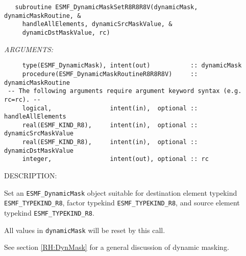 \begin{verbatim}   subroutine ESMF_DynamicMaskSetR8R8R8V(dynamicMask, dynamicMaskRoutine, &
     handleAllElements, dynamicSrcMaskValue, &
     dynamicDstMaskValue, rc)\end{verbatim}{\em ARGUMENTS:}
\begin{verbatim}     type(ESMF_DynamicMask), intent(out)           :: dynamicMask
     procedure(ESMF_DynamicMaskRoutineR8R8R8V)     :: dynamicMaskRoutine
 -- The following arguments require argument keyword syntax (e.g. rc=rc). --
     logical,                intent(in),  optional :: handleAllElements
     real(ESMF_KIND_R8),     intent(in),  optional :: dynamicSrcMaskValue
     real(ESMF_KIND_R8),     intent(in),  optional :: dynamicDstMaskValue
     integer,                intent(out), optional :: rc
           \end{verbatim}
{\sf DESCRIPTION:\\ }


     \label{api:DynamicMaskSetR8R8R8V}
     Set an {\tt ESMF\_DynamicMask} object suitable for 
     destination element typekind {\tt ESMF\_TYPEKIND\_R8},
     factor typekind {\tt ESMF\_TYPEKIND\_R8}, and
     source element typekind {\tt ESMF\_TYPEKIND\_R8}.
     
     All values in {\tt dynamicMask} will be reset by this call.
  
     See section \ref{RH:DynMask} for a general discussion of dynamic masking.
  
